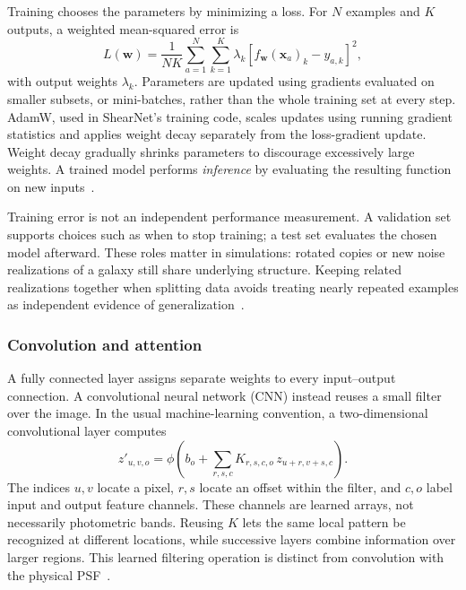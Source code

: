 Training chooses the parameters by minimizing a loss. For $N$ examples and $K$ outputs, a weighted mean-squared error is
\begin{equation}
    L(\boldsymbol{w})=\frac{1}{NK}\sum_{a=1}^{N}\sum_{k=1}^{K}
    \lambda_k\left[f_{\boldsymbol{w}}(\boldsymbol{x}_a)_k-y_{a,k}\right]^2,
    \label{eq:mse}
\end{equation}
with output weights $\lambda_k$. Parameters are updated using gradients evaluated on smaller subsets, or mini-batches, rather than the whole training set at every step. AdamW, used in ShearNet's training code, scales updates using running gradient statistics and applies weight decay separately from the loss-gradient update. Weight decay gradually shrinks parameters to discourage excessively large weights. A trained model performs \emph{inference} by evaluating the resulting function on new inputs~\cite{goodfellow_deep_2016,loshchilov_decoupled_2019,field_shearnet_2026}.

Training error is not an independent performance measurement. A validation set supports choices such as when to stop training; a test set evaluates the chosen model afterward. These roles matter in simulations: rotated copies or new noise realizations of a galaxy still share underlying structure. Keeping related realizations together when splitting data avoids treating nearly repeated examples as independent evidence of generalization~\cite{goodfellow_deep_2016,tewes_weak-lensing_2019}.

\subsubsection{Convolution and attention}


A fully connected layer assigns separate weights to every input--output connection. A convolutional neural network (CNN) instead reuses a small filter over the image. In the usual machine-learning convention, a two-dimensional convolutional layer computes
\begin{equation}
    z'_{u,v,o}=\phi\!\left(b_o+
    \sum_{r,s,c}K_{r,s,c,o}\,z_{u+r,v+s,c}\right).
    \label{eq:convolution}
\end{equation}
The indices $u,v$ locate a pixel, $r,s$ locate an offset within the filter, and $c,o$ label input and output feature channels. These channels are learned arrays, not necessarily photometric bands. Reusing $K$ lets the same local pattern be recognized at different locations, while successive layers combine information over larger regions. This learned filtering operation is distinct from convolution with the physical PSF~\cite{goodfellow_deep_2016}.

